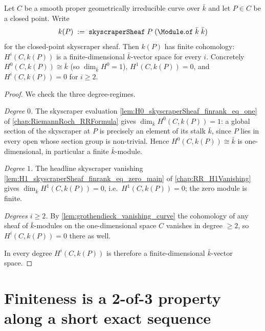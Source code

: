 \begin{lemma}
  \label{lem:HModule_skyscraper_finite}
  Let \(C\) be a smooth proper geometrically irreducible curve over
  \(\bar k\) and let \(P \in C\) be a closed point. Write
  \[
    k(P) \;:=\; \mathtt{skyscraperSheaf}\;P\;
      (\Module.\mathtt{of}\;\bar k\;\bar k)
  \]
  for the closed-point skyscraper sheaf. Then \(k(P)\) has finite
  cohomology: \(H^i(C, k(P))\) is a finite-dimensional \(\bar k\)-vector
  space for every \(i\). Concretely \(H^0(C, k(P)) \cong \bar k\) (so
  \(\dim_{\bar k} H^0 = 1\)), \(H^1(C, k(P)) = 0\), and
  \(H^i(C, k(P)) = 0\) for \(i \ge 2\).

\end{lemma}

\begin{proof}
  We check the three degree-regimes.

  \emph{Degree \(0\).} The skyscraper evaluation
  \cref{lem:H0_skyscraperSheaf_finrank_eq_one} of
  \cref{chap:RiemannRoch_RRFormula} gives
  \(\dim_{\bar k} H^0(C, k(P)) = 1\): a global section of the skyscraper
  at \(P\) is precisely an element of its stalk \(\bar k\), since
  \(P\) lies in every open whose section group is non-trivial. Hence
  \(H^0(C, k(P)) \cong \bar k\) is one-dimensional, in particular a
  finite \(\bar k\)-module.

  \emph{Degree \(1\).} The headline skyscraper vanishing
  \cref{lem:H1_skyscraperSheaf_finrank_eq_zero_main} of
  \cref{chap:RR_H1Vanishing} gives \(\dim_{\bar k} H^1(C, k(P)) = 0\),
  i.e.\ \(H^1(C, k(P)) = 0\); the zero module is finite.

  \emph{Degrees \(i \ge 2\).} By
  \cref{lem:grothendieck_vanishing_curve} the cohomology of any sheaf of
  \(\bar k\)-modules on the one-dimensional space \(C\) vanishes in
  degree \(\ge 2\), so \(H^i(C, k(P)) = 0\) there as well.

  In every degree \(H^i(C, k(P))\) is therefore a finite-dimensional
  \(\bar k\)-vector space.
\end{proof}

\section{Finiteness is a 2-of-3 property along a short exact sequence}

